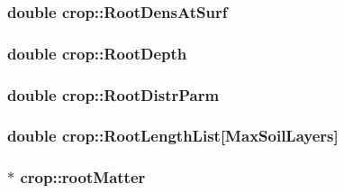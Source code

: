 \label{classcrop_a3bd248dac15a2aefd7289240ffeeb879}
\hypertarget{classcrop_a512f2450d70fb9f2a84d046d5a090a94}{
\subsubsection[{RootDensAtSurf}]{\setlength{\rightskip}{0pt plus 5cm}double {\bf crop::RootDensAtSurf}}}
\label{classcrop_a512f2450d70fb9f2a84d046d5a090a94}
\hypertarget{classcrop_aefe9049cee98b6ac81f4362c4a1190a9}{
\subsubsection[{RootDepth}]{\setlength{\rightskip}{0pt plus 5cm}double {\bf crop::RootDepth}}}
\label{classcrop_aefe9049cee98b6ac81f4362c4a1190a9}
\hypertarget{classcrop_a5c8bcec383225ccfa1997ed7de4b2446}{
\subsubsection[{RootDistrParm}]{\setlength{\rightskip}{0pt plus 5cm}double {\bf crop::RootDistrParm}}}
\label{classcrop_a5c8bcec383225ccfa1997ed7de4b2446}
\hypertarget{classcrop_ad629acdfd462323490f91ad3ce9a7b59}{
\subsubsection[{RootLengthList}]{\setlength{\rightskip}{0pt plus 5cm}double {\bf crop::RootLengthList}\mbox{[}MaxSoilLayers\mbox{]}}}
\label{classcrop_ad629acdfd462323490f91ad3ce9a7b59}
\hypertarget{classcrop_a2ca05aa427979d52b8fbbba1cc5150cf}{
\subsubsection[{rootMatter}]{$\ast$ {\bf crop::rootMatter}}}
